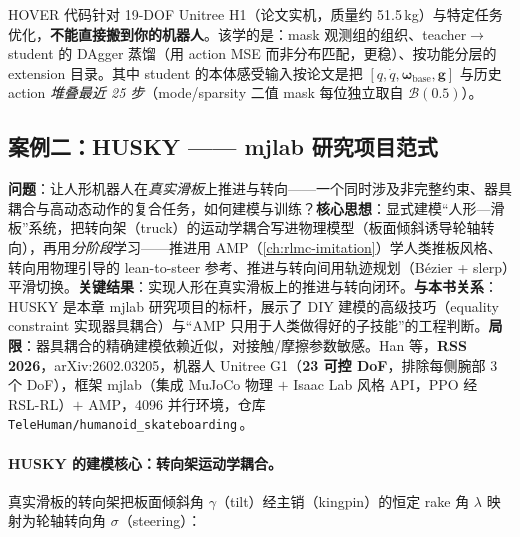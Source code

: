 \begin{note}
HOVER 代码针对 19-DOF Unitree H1（论文实机，质量约 51.5\,kg）与特定任务优化，\textbf{不能直接搬到你的机器人}。该学的是：mask 观测组的组织、teacher$\to$student 的 DAgger 蒸馏（用 action MSE 而非分布匹配，更稳）、按功能分层的 extension 目录。其中 student 的本体感受输入按论文是把 $[q,\dot q,\boldsymbol\omega_{\text{base}},\mathbf{g}]$ 与历史 action \emph{堆叠最近 25 步}（mode/sparsity 二值 mask 每位独立取自 $\mathcal{B}(0.5)$）。
\end{note}

\subsection{案例二：HUSKY —— mjlab 研究项目范式}
\label{sec:rlmc-diy-husky}

\begin{paper}\label{paper:rlmc-diy-husky}
\textbf{问题}：让人形机器人在\emph{真实滑板}上推进与转向——一个同时涉及非完整约束、器具耦合与高动态动作的复合任务，如何建模与训练？\textbf{核心思想}：显式建模“人形—滑板”系统，把转向架（truck）的运动学耦合写进物理模型（板面倾斜诱导轮轴转向），再用\emph{分阶段}学习——推进用 AMP（\cref{ch:rlmc-imitation}）学人类推板风格、转向用物理引导的 lean-to-steer 参考、推进与转向间用轨迹规划（Bézier + slerp）平滑切换。\textbf{关键结果}：实现人形在真实滑板上的推进与转向闭环。\textbf{与本书关系}：HUSKY 是本章 mjlab 研究项目的标杆，展示了 DIY 建模的高级技巧（equality constraint 实现器具耦合）与“AMP 只用于人类做得好的子技能”的工程判断。\textbf{局限}：器具耦合的精确建模依赖近似，对接触/摩擦参数敏感。Han 等，\textbf{RSS 2026}，arXiv:2602.03205，机器人 Unitree G1（\textbf{23 可控 DoF}，排除每侧腕部 3 个 DoF），框架 mjlab（集成 MuJoCo 物理 $+$ Isaac Lab 风格 API，PPO 经 RSL-RL）$+$ AMP，4096 并行环境，仓库 \texttt{TeleHuman/\allowbreak humanoid\_skateboarding}\,\cite{husky2026}。
\end{paper}

\paragraph{HUSKY 的建模核心：转向架运动学耦合。}真实滑板的转向架把板面倾斜角 $\gamma$（tilt）经主销（kingpin）的恒定 rake 角 $\lambda$ 映射为轮轴转向角 $\sigma$（steering）：


